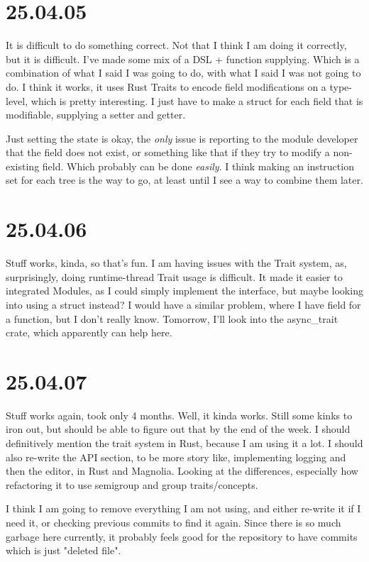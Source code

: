 \section{25.04.05}

It is difficult to do something correct. Not that I think I am doing it
correctly, but it is difficult. I've made some mix of a DSL + function
supplying. Which is a combination of what I said I was going to do, with what I
said I was not going to do. I think it works, it uses Rust Traits to encode
field modifications on a type-level, which is pretty interesting. I just have to
make a struct for each field that is modifiable, supplying a setter and getter.

Just setting the state is okay, the \textit{only} issue is reporting to
the module developer that the field does not exist, or something like that if
they try to modify a non-existing field. Which probably can be done
\textit{easily}. I think making an instruction set for each tree is the way to
go, at least until I see a way to combine them later.

\section{25.04.06}

Stuff works, kinda, so that's fun. I am having issues with the Trait system, as,
surprisingly, doing runtime-thread Trait usage is difficult. It made it easier
to integrated Modules, as I could simply implement the interface, but maybe
looking into using a struct instead? I would have a similar problem, where I
have field for a function, but I don't really know. Tomorrow, I'll look into
the async_trait crate, which apparently can help here.

\section{25.04.07}

Stuff works again, took only 4 months. Well, it kinda works. Still some kinks to
iron out, but should be able to figure out that by the end of the week. I should
definitively mention the trait system in Rust, because I am using it a lot. I
should also re-write the API section, to be more story like, implementing
logging and then the editor, in Rust and Magnolia. Looking at the differences,
especially how refactoring it to use semigroup and group traits/concepts.

I think I am going to remove everything I am not using, and either re-write it
if I need it, or checking previous commits to find it again. Since there is so
much garbage here currently, it probably feels good for the repository to have
commits which is just "deleted file".

